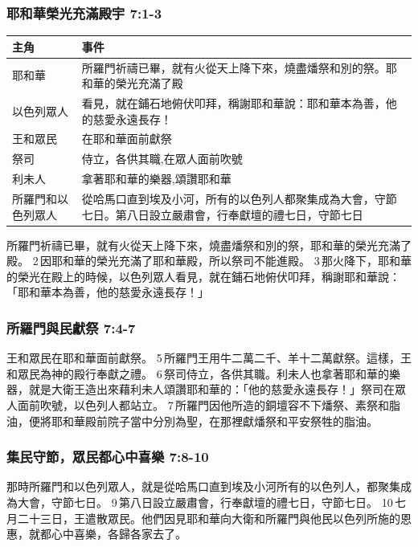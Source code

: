 \subsubsection{耶和華榮光充滿殿宇 7:1-3}
\begin{table}[H]
\centering 
\begin{tabular}{p{3.75cm}|p{13.5cm}}\hline\hline
主角 &事件\\\hline\hline
耶和華  &  所羅門祈禱已畢，就有火從天上降下來，燒盡燔祭和別的祭。耶和華的榮光充滿了殿\\\hline
以色列眾人   &看見，就在鋪石地俯伏叩拜，稱謝耶和華說：耶和華本為善，他的慈愛永遠長存！    \\\hline
王和眾民& 在耶和華面前獻祭    \\\hline
祭司& 侍立，各供其職,在眾人面前吹號\\\hline
利未人&拿著耶和華的樂器,頌讚耶和華\\\hline
所羅門和以色列眾人&從哈馬口直到埃及小河，所有的以色列人都聚集成為大會，守節七日。第八日設立嚴肅會，行奉獻壇的禮七日，守節七日\\\hline
\end{tabular}
\end{table}
所羅門祈禱已畢，就有火從天上降下來，燒盡燔祭和別的祭，耶和華的榮光充滿了殿。 2 因耶和華的榮光充滿了耶和華殿，所以祭司不能進殿。 3 那火降下，耶和華的榮光在殿上的時候，以色列眾人看見，就在鋪石地俯伏叩拜，稱謝耶和華說：「耶和華本為善，他的慈愛永遠長存！」

\subsubsection{所羅門與民獻祭 7:4-7}
王和眾民在耶和華面前獻祭。 5 所羅門王用牛二萬二千、羊十二萬獻祭。這樣，王和眾民為神的殿行奉獻之禮。 6 祭司侍立，各供其職。利未人也拿著耶和華的樂器，就是大衛王造出來藉利未人頌讚耶和華的：「他的慈愛永遠長存！」祭司在眾人面前吹號，以色列人都站立。 7 所羅門因他所造的銅壇容不下燔祭、素祭和脂油，便將耶和華殿前院子當中分別為聖，在那裡獻燔祭和平安祭牲的脂油。

\subsubsection{集民守節，眾民都心中喜樂 7:8-10}
那時所羅門和以色列眾人，就是從哈馬口直到埃及小河所有的以色列人，都聚集成為大會，守節七日。 9 第八日設立嚴肅會，行奉獻壇的禮七日，守節七日。 10 七月二十三日，王遣散眾民。他們因見耶和華向大衛和所羅門與他民以色列所施的恩惠，就都心中喜樂，各歸各家去了。

